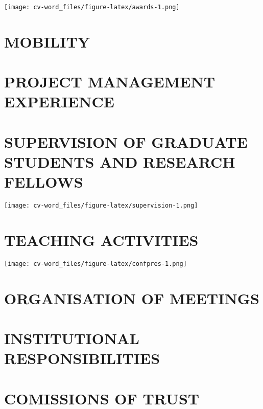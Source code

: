 \documentclass[]{article}
\begin{document}
\texttt{[image: cv-word\_files/figure-latex/awards-1.png]}

\hypertarget{mobility}{%
\section{MOBILITY}\label{mobility}}

\hypertarget{project-management-experience}{%
\section{PROJECT MANAGEMENT
EXPERIENCE}\label{project-management-experience}}

\hypertarget{supervision-of-graduate-students-and-research-fellows}{%
\section{SUPERVISION OF GRADUATE STUDENTS AND RESEARCH
FELLOWS}\label{supervision-of-graduate-students-and-research-fellows}}

\texttt{[image: cv-word\_files/figure-latex/supervision-1.png]}

\hypertarget{teaching-activities}{%
\section{TEACHING ACTIVITIES}\label{teaching-activities}}

\texttt{[image: cv-word\_files/figure-latex/confpres-1.png]}

\hypertarget{organisation-of-meetings}{%
\section{ORGANISATION OF MEETINGS}\label{organisation-of-meetings}}

\hypertarget{institutional-responsibilities}{%
\section{INSTITUTIONAL
RESPONSIBILITIES}\label{institutional-responsibilities}}

\hypertarget{comissions-of-trust}{%
\section{COMISSIONS OF TRUST}\label{comissions-of-trust}}
\end{document}
